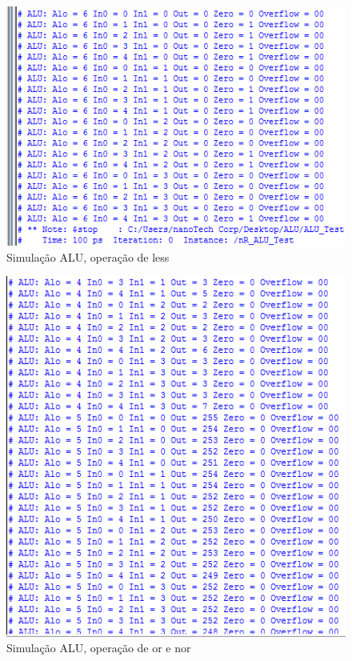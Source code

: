 \documentclass[a4paper, 10pt]{article}
\begin{document}
\begin{figure}[H]
	\centering
	\includegraphics[scale=0.7]{sumuALU(less).PNG}
	\caption{Simulação ALU, operação de less}
	\label{Rotulo}
\end{figure}

\begin{figure}[H]
	\centering
	\includegraphics[scale=0.7]{sumuALU(or-nor).PNG}
	\caption{Simulação ALU, operação de or e nor}
	\label{Rotulo}
\end{figure}
\end{document}
